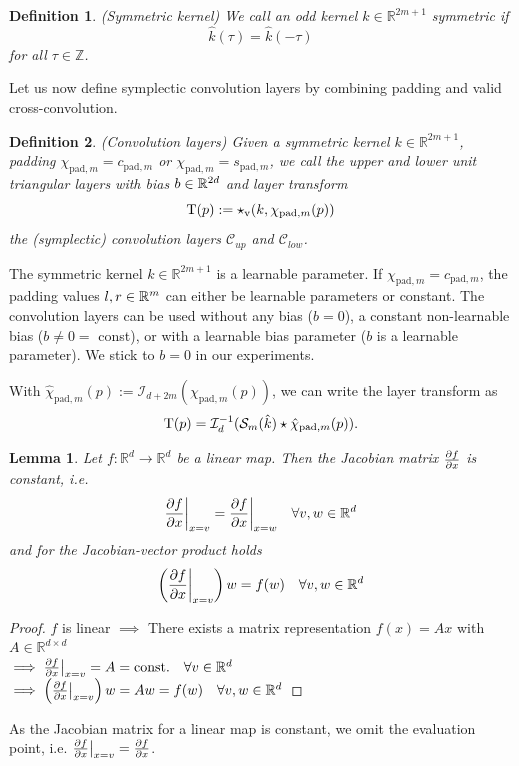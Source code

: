 \documentclass[twoside,a4paper]{article}
\newtheorem{definition}{Definition}
\newtheorem{lemma}{Lemma}
\begin{document}
\begin{definition}
	(Symmetric kernel)
	We call an odd kernel $k \in \mathbb{R}^{2m+1}$ symmetric if
	\begin{equation*}
		\hat{k}(\tau) = \hat{k}(-\tau)
	\end{equation*}
	for all $\tau \in \mathbb{Z}$.
\end{definition}

Let us now define symplectic convolution layers by combining padding and valid 
cross-convolution.
\begin{definition}\label{def_conv_layer}
	(Convolution layers)
	Given a symmetric kernel $k \in \mathbb{R}^{2m+1}$, padding
	$\chi_{\text{pad},m} = c_{\text{pad},m}$ or $\chi_{\text{pad},m} = s_{\text{pad},m}$,
	we call the upper and lower unit triangular layers with bias $b \in \mathbb{R}^{2d}$ and layer transform
	\begin{equation*}
		\mathrm{T}(p) := \star_{\text{v}}(k,\chi_{\text{pad},m}(p))
	\end{equation*}
	the (symplectic) convolution layers $\mathcal{C}_{up}$ and $\mathcal{C}_{low}$.
\end{definition}
The symmetric kernel $k \in \mathbb{R}^{2m+1}$ is a learnable parameter.
If $\chi_{\text{pad},m} = c_{\text{pad},m}$, the padding values $l,r \in \mathbb{R}^m$ can either
be learnable parameters or constant. The convolution layers can be used without any bias ($b=0$), a
constant non-learnable bias ($b \neq 0 =$ const), or with a learnable bias parameter 
($b$ is a learnable parameter). We stick to $b=0$ in our experiments.

With $\hat{\chi}_{\text{pad},m}(p) := \mathcal{I}_{d+2m}(\chi_{\text{pad},m}(p))$,
we can write the layer transform as
\begin{equation}\label{eq_conv_layer_transform}
	\mathrm{T}(p) =
	\mathcal{I}_{d}^{-1} (
		\mathcal{S}_{m}(\hat{k}) \star \hat{\chi}_{\text{pad},m}(p)
	)
	.
\end{equation}

\begin{lemma}\label{jac_linear_map}
	Let $f: \mathbb{R}^d \to \mathbb{R}^d$ be a linear map. Then the Jacobian matrix
	$\frac{\partial f}{\partial x}$ is constant, i.e.
	\begin{equation*}
		\frac{\partial f}{\partial x} \bigg|_{x = v} = \frac{\partial f}{\partial x} \bigg|_{x = w} \quad \forall v,w \in \mathbb{R}^d
	\end{equation*}
	and for the Jacobian-vector product holds
	\begin{equation*}
		\left( \frac{\partial f}{\partial x} \bigg|_{x = v} \right) w = f(w) \quad \forall v,w \in \mathbb{R}^d
	\end{equation*}
\end{lemma}
\begin{proof}
	$f$ is linear $\implies$ There exists a matrix representation $f(x) = Ax$ with
	$A \in \mathbb{R}^{d \times d}$ \\
	$\implies \frac{\partial f}{\partial x} \big|_{x=v} = A = \text{const.} \quad \forall v \in \mathbb{R}^d$
	$\implies \left( \frac{\partial f}{\partial x} \big|_{x=v} \right) w = Aw = f(w) \quad \forall v,w \in \mathbb{R}^d$
\end{proof}
As the Jacobian matrix for a linear map is constant, we omit the evaluation point, i.e.
$\frac{\partial f}{\partial x} \big|_{x=v} = \frac{\partial f}{\partial x}$.
\end{document}
